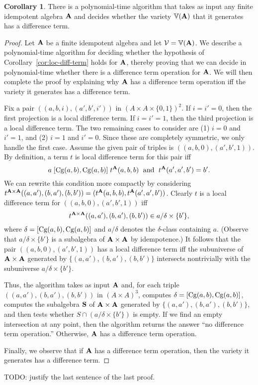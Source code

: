 \documentclass[12pt]{amsart}
\numberwithin{equation}{section}
\theoremstyle{plain}
\theoremstyle{definition}
\newtheorem*{cor}{Corollary}
\begin{document}
\begin{cor}
  There is a polynomial-time algorithm that takes as input
  any finite idempotent algebra $\mathbf{A}$ and decides whether the variety
  $\operatorname{\mathbb{V}}(\mathbf{A})$ that it generates has a difference term.
\end{cor}
\begin{proof}
  Let $\mathbf{A}$ be a finite idempotent algebra and let
  $\mathcal{V} = \operatorname{\mathbb{V}}(\mathbf{A})$.
  We describe a polynomial-time algorithm for deciding whether
  the hypothesis of Corollary~\ref{cor:loc-diff-term} holds for $\mathbf{A}$, thereby
  proving that we can decide in polynomial-time whether
  there is a difference term  operation for $\mathbf{A}$. We will then complete the
  proof by explaining why $\mathbf{A}$ has a difference term operation iff the variety
  it generates has a difference term. 

  Fix a pair
  $((a,b,i), (a',b',i'))$ in $(A\times A \times \{0,1\})^2$. If $i = i' = 0$,
  then the first projection is a local difference term. If $i = i' = 1$,  
    then the third projection is a local difference term. The two remaining cases to
    consider are (1) $i = 0$ and $i'=1$, and (2)
    $i = 1$ and $i'=0$. Since these are completely symmetric, we only handle the
    first case. Assume  the given pair of triples is
    $((a,b,0), (a',b',1))$.  By definition, a term $t$ is local difference term
    for this pair iff
    \[
    a\mathrel{[\operatorname{Cg}(a,b), \operatorname{Cg}(a,b)]} t^{\mathbf{A}}(a,b,b) \; \text{ and } \;
    t^{\mathbf{A}}(a',a',b') = b'.
    \]
    We can rewrite this condition more compactly by %
    considering 
    $t^{\mathbf{A}\times \mathbf{A}}((a,a'), (b,a'), (b,b')) =
    (t^{\mathbf{A}}(a,b,b),t^{\mathbf{A}}(a',a',b'))$.
    Clearly $t$ is a local difference term for
    $((a,b,0), (a',b',1))$ iff
    \[
    t^{\mathbf{A}\times \mathbf{A}}((a,a'), (b,a'), (b,b'))\in a/\delta \times \{b'\},
    \]
    where $\delta = [\operatorname{Cg}(a,b), \operatorname{Cg}(a,b)]$ and $a/\delta$ denotes the
    $\delta$-class containing $a$.
    (Observe that $a/\delta \times \{b'\}$ is a subalgebra of $\mathbf{A} \times \mathbf{A}$
    by idempotence.)
    It follows that the pair
    $((a,b,0), (a',b',1))$ has a local difference term iff
    the subuniverse of $\mathbf{A}\times \mathbf{A}$ generated by
    $\{(a,a'), (b,a'), (b,b')\}$ intersects nontrivially with the subuniverse
    $a/\delta \times \{b'\}$.

    Thus, the algorithm takes as input $\mathbf{A}$ and, for each triple
    $((a,a'), (b,a'), (b,b'))$ in $(A\times A)^3$, computes
    $\delta = [\operatorname{Cg}(a,b), \operatorname{Cg}(a,b)]$, computes the subalgebra
    $\mathbf{S}$ of $\mathbf{A}\times \mathbf{A}$ generated by
    $\{(a,a'), (b,a'), (b,b')\}$, and then
    tests whether $S \cap (a/\delta \times \{b'\})$ is empty.
    If we find an empty intersection at any point, then the algorithm returns
    the answer ``no difference term operation.'' Otherwise,
    $\mathbf{A}$ has a difference term operation.

    Finally, we observe that if $\mathbf{A}$ has a difference term operation, then the
    variety it generates has a difference term.
\end{proof}
    TODO: justify the last sentence of the last proof.




\end{document}
